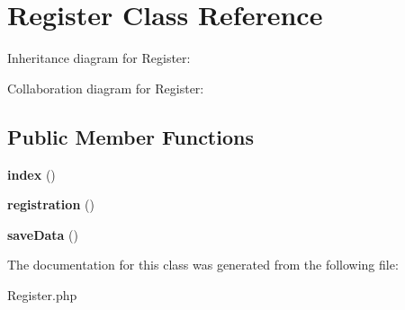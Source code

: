 \hypertarget{class_register}{}\section{Register Class Reference}
\label{class_register}


Inheritance diagram for Register\+:


Collaboration diagram for Register\+:
\subsection*{Public Member Functions}
\begin{DoxyCompactItemize}
\item 
\mbox{\label{class_register_a149eb92716c1084a935e04a8d95f7347}} 
{\bfseries index} ()
\item 
\mbox{\label{class_register_a0865ab7639d4115d060298a4394265d2}} 
{\bfseries registration} ()
\item 
\mbox{\label{class_register_a77c4843434b6a87f364e85e2de1358cd}} 
{\bfseries save\+Data} ()
\end{DoxyCompactItemize}


The documentation for this class was generated from the following file\+:\begin{DoxyCompactItemize}
\item 
Register.\+php\end{DoxyCompactItemize}
